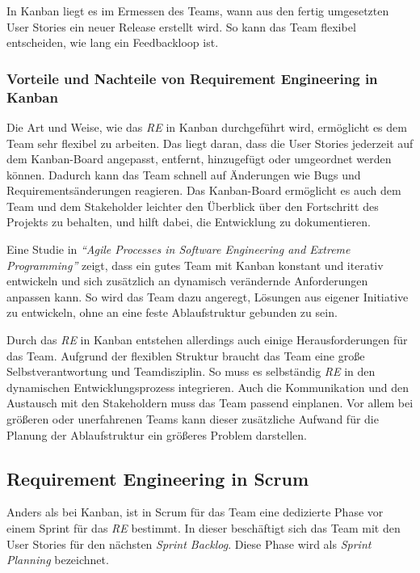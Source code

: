 \documentclass[acmtog]{acmart}
\begin{document}
In Kanban liegt es im Ermessen des Teams, wann aus den fertig umgesetzten User Stories ein neuer Release
erstellt wird. So kann das Team flexibel entscheiden, wie lang ein Feedbackloop ist. \cite{agileprocesses}

\subsubsection{Vorteile und Nachteile von Requirement Engineering in Kanban}

Die Art und Weise, wie das \emph{RE} in Kanban durchgeführt wird, ermöglicht es dem Team sehr flexibel zu arbeiten.
Das liegt daran, dass die User Stories jederzeit auf dem Kanban-Board angepasst, entfernt,
hinzugefügt oder umgeordnet werden können. Dadurch kann das Team schnell auf Änderungen wie Bugs und Requirementsänderungen
reagieren. Das Kanban-Board ermöglicht es auch dem Team und dem Stakeholder leichter den Überblick über den
Fortschritt des Projekts zu behalten, und hilft dabei, die Entwicklung zu dokumentieren.

Eine Studie in \emph{``Agile Processes in Software Engineering and Extreme Programming''} \cite{agileprocesses} zeigt, dass ein gutes Team mit Kanban konstant und iterativ entwickeln und sich zusätzlich
an dynamisch verändernde Anforderungen anpassen kann. So wird das Team dazu angeregt, Lösungen aus eigener
Initiative zu entwickeln, ohne an eine feste Ablaufstruktur gebunden zu sein. \cite{reqkanban}

Durch das \emph{RE} in Kanban entstehen allerdings auch einige Herausforderungen für das Team. Aufgrund der flexiblen
Struktur braucht das Team eine große Selbstverantwortung und Teamdisziplin. So muss es selbständig \emph{RE} in den
dynamischen Entwicklungsprozess integrieren. Auch die Kommunikation und den Austausch mit den Stakeholdern muss
das Team passend einplanen. Vor allem bei größeren oder unerfahrenen Teams kann dieser zusätzliche Aufwand für
die Planung der Ablaufstruktur ein größeres Problem darstellen. \cite{kanbannod}

\subsection{Requirement Engineering in Scrum}

Anders als bei Kanban, ist in Scrum für das Team eine dedizierte Phase vor einem Sprint für das \emph{RE} bestimmt. In dieser
beschäftigt sich das Team mit den User Stories für den nächsten \emph{Sprint Backlog}. Diese Phase wird als \emph{Sprint Planning} bezeichnet. \cite{reinscrum}
\end{document}
